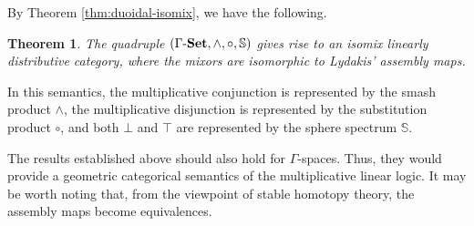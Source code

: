 \documentclass{article}
\numberwithin{equation}{section}
\newtheorem{thm}{Theorem}[section]
\theoremstyle{definition}
\begin{document}
By Theorem \ref{thm:duoidal-isomix}, we have the following.

\begin{thm}The quadruple $(\Gamma \mathchar`-\mathbf{Set}, \wedge, \circ,  \mathbb{S})$ gives rise to an isomix linearly distributive category, where the mixors are isomorphic to Lydakis' assembly maps. 
\end{thm}

In this semantics, the multiplicative conjunction is represented by the smash product $\wedge$, the multiplicative disjunction is represented by the substitution product $\circ$, and both $\bot$ and $\top$ are represented by the sphere spectrum $\mathbb{S}$.

The results established above should also hold for $\Gamma$-spaces.
Thus, they would provide a geometric categorical semantics of the multiplicative linear logic.
It may be worth noting that, from the viewpoint of stable homotopy theory, the assembly maps become equivalences.
\end{document}
